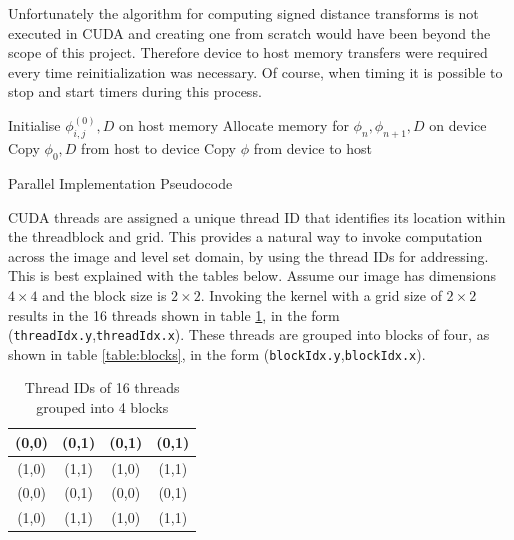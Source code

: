 Unfortunately the algorithm for computing signed distance transforms is not executed in CUDA and creating one from scratch would have been beyond the scope of this project. Therefore device to host memory transfers were required every time reinitialization was necessary. Of course, when timing it is possible to stop and start timers during this process.

	
\begin{algorithm}[h]
\dontprintsemicolon
\BlankLine
\SetLine
Initialise $\phi_{i,j}^(0), D$ on host memory\;
Allocate memory for $\phi_n ,\phi_{n+1}, D$ on device\;
Copy $\phi_0 , D$ from host to device\;
Copy $\phi$ from device to host\;
\caption{Parallel Implementation Pseudocode}\label{alg:cuda1}
\end{algorithm}	

CUDA threads are assigned a unique thread ID that identifies its location within the threadblock and grid. This provides a natural way to invoke computation across the image and level set domain, by using the thread IDs for addressing.  This is best explained with the tables below. Assume our image has dimensions $4\times 4$ and the block size is $2 \times 2$. Invoking the kernel with a grid size of $2 \times 2$ results in the 16 threads shown in table \ref{table:threads}, in the form (\texttt{threadIdx.y},\texttt{threadIdx.x}). These threads are grouped into blocks of four, as shown in table \ref{table:blocks}, in the form (\texttt{blockIdx.y},\texttt{blockIdx.x}). 

\begin{table}
\begin{center}
  \begin{tabular}{ | c | c || c | c |}
    \hline
    (0,0) & (0,1) & (0,1) & (0,1) \\ \hline
    (1,0) & (1,1) & (1,0) & (1,1) \\ \hline\hline
    (0,0) & (0,1) & (0,0) & (0,1) \\ \hline
    (1,0) & (1,1) & (1,0) & (1,1) \\
    \hline
  \end{tabular}
\end{center}
\label{table:threads}\caption{Thread IDs of 16 threads grouped into 4 blocks}
\end{table}

